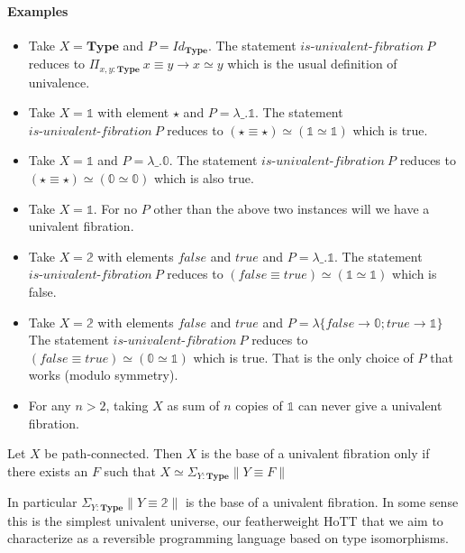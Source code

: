 \documentclass[format=acmlarge,review,natbib]{acmart}
\newcommand{\Typ}{\mathbf{Type}}
\newcommand{\fc}{\mathit{false}}
\newcommand{\tc}{\mathit{true}}
\begin{document}
\noindent\paragraph*{Examples}
\begin{itemize}
\item Take $X = \Typ$ and $P = \mathit{Id}_{\Typ}$. The statement
  $\textit{is-univalent-fibration}~P$ reduces to $\Pi_{x,y:\Typ}~x \equiv y \to
  x \simeq y$ which is the usual definition of univalence.
\item Take $X = \mathbb{1}$ with element $\star$ and
  $P = \lambda \_. \mathbb{1}$. The statement
  $\textit{is-univalent-fibration}~P$ reduces to
  $(\star\equiv\star)\simeq(\mathbb{1}\simeq\mathbb{1})$ which is true.
\item Take $X = \mathbb{1}$ and $P = \lambda \_. \mathbb{0}$. The statement
  $\textit{is-univalent-fibration}~P$ reduces to
  $(\star\equiv\star)\simeq(\mathbb{0}\simeq\mathbb{0})$ which is also true.
\item Take $X = \mathbb{1}$. For no $P$ other than the above two instances will
  we have a univalent fibration.
\item Take $X = \mathbb{2}$ with elements $\fc$ and $\tc$ and
  $P = \lambda \_. \mathbb{1}$. The statement
  $\textit{is-univalent-fibration}~P$ reduces to $(\fc \equiv \tc) \simeq
  (\mathbb{1}\simeq\mathbb{1})$ which is false.
\item Take $X = \mathbb{2}$ with elements $\fc$ and $\tc$ and
  $P = \lambda \{ \fc \to \mathbb{0}; \tc \to \mathbb{1} \}$ The statement
  $\textit{is-univalent-fibration}~P$ reduces to $(\fc \equiv \tc) \simeq
  (\mathbb{0}\simeq\mathbb{1})$ which is true. That is the only choice of $P$
  that works (modulo symmetry).
\item For any $n > 2$, taking $X$ as sum of $n$ copies of $\mathbb{1}$ can never
  give a univalent fibration.
\end{itemize}

\begin{theorem}
  Let $X$ be path-connected. Then $X$ is the base of a univalent fibration only
  if there exists an $F$ such that $X \simeq \Sigma_{Y : \Typ} \| Y \equiv F \|$
\end{theorem}

\noindent In particular $\Sigma_{Y : \Typ} \| Y \equiv \mathbb{2} \|$ is the base of a
univalent fibration. In some sense this is the simplest univalent universe, our
featherweight HoTT that we aim to characterize as a reversible programming
language based on type isomorphisms.
\end{document}
